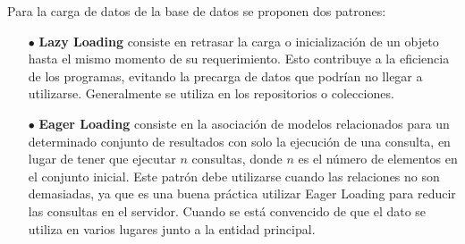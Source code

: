 Para la carga de datos de la base de datos se proponen dos patrones:

\begin{enumerate}
    \item[$\bullet$] \textbf{Lazy Loading} consiste en retrasar la carga o inicialización de un objeto hasta el mismo momento de su requerimiento. Esto contribuye a la eficiencia de los programas, evitando la precarga de datos que podrían no llegar a utilizarse. Generalmente se utiliza en los repositorios o colecciones. 
    \item[$\bullet$] \textbf{Eager Loading} consiste en la asociación de modelos relacionados para un determinado conjunto de resultados con solo la ejecución de una consulta, en lugar de tener que ejecutar $n$ consultas, donde $n$ es el número de elementos en el conjunto inicial. Este patrón debe utilizarse cuando las relaciones no son demasiadas, ya que es una buena práctica utilizar Eager Loading para reducir las consultas en el servidor. Cuando se está convencido de que el dato se utiliza en varios lugares junto a la entidad principal.
\end{enumerate}